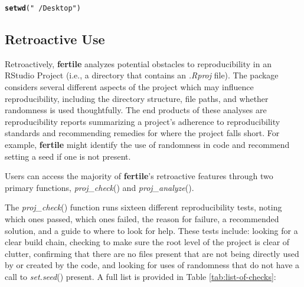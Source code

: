 \documentclass[APA,LATO1COL]{WileyNJD-v2}\usepackage[]{graphicx}\usepackage[]{color}
\makeatletter
\newcommand{\hlstr}[1]{\textcolor[rgb]{0.192,0.494,0.8}{#1}}%
\newcommand{\hlstd}[1]{\textcolor[rgb]{0.345,0.345,0.345}{#1}}%
\newcommand{\hlkwd}[1]{\textcolor[rgb]{0.737,0.353,0.396}{\textbf{#1}}}%
\newenvironment{kframe}{%
 \def\at@end@of@kframe{}%
 \ifinner\ifhmode%
  \def\at@end@of@kframe{\end{minipage}}%
  \begin{minipage}{\columnwidth}%
 \fi\fi%
 \def\FrameCommand##1{\hskip\@totalleftmargin \hskip-\fboxsep
 \colorbox{shadecolor}{##1}\hskip-\fboxsep
     \hskip-\linewidth \hskip-\@totalleftmargin \hskip\columnwidth}%
 \MakeFramed {\advance\hsize-\width
   \@totalleftmargin\z@ \linewidth\hsize
   \@setminipage}}%
 {\par\unskip\endMakeFramed%
 \at@end@of@kframe}
\newenvironment{knitrout}{}{} %
\newcommand{\cmd}[1]{\textit{#1}}
\newcommand{\pkg}[1]{\textbf{#1}}
\newcommand{\func}[1]{\textit{#1}()}
\makeatother
\begin{document}
\begin{knitrout}
\color{fgcolor}\begin{kframe}
\begin{alltt}
\hlkwd{setwd}\hlstd{(}\hlstr{"~/Desktop"}\hlstd{)}
\end{alltt}


{\ttfamily\noindent\bfseries\color{errorcolor}{\#\# Error: setwd() is likely to break reproducibility. Use here::here() instead.}}\end{kframe}
\end{knitrout}


\subsection{Retroactive Use}

Retroactively, \pkg{fertile} analyzes potential obstacles to reproducibility in an RStudio Project (i.e., a directory that contains an \cmd{.Rproj} file). The package considers several different aspects of the project which may influence reproducibility, including the directory structure, file paths, and whether randomness is used thoughtfully.
The end products of these analyses are reproducibility reports summarizing a project's adherence to reproducibility standards and recommending remedies for where the project falls short. For example, \pkg{fertile} might identify the use of randomness in code and recommend setting a seed if one is not present.

Users can access the majority of \pkg{fertile}'s retroactive features through two primary functions, \func{proj\_check} and \func{proj\_analyze}. 

The \func{proj\_check} function runs sixteen different reproducibility tests, noting which ones passed, which ones failed, the reason for failure, a recommended solution, and a guide to where to look for help. These tests include: looking for a clear build chain, checking to make sure the root level of the project is clear of clutter, confirming that there are no files present that are not being directly used by or created by the code, and looking for uses of randomness that do not have a call to \func{set.seed} present. A full list is provided in Table \ref{tab:list-of-checks}:

\vspace{2mm}
\end{document}
